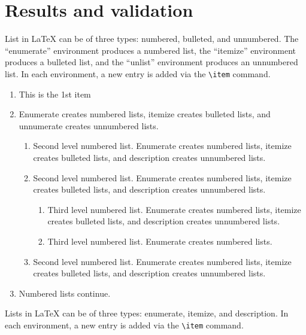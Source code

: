 \documentclass[12pt,a4paper]{article}
\begin{document}
\section{Results and validation}\label{sec7}

List in \LaTeX{} can be of three types: numbered, bulleted, and unnumbered. The ``enumerate'' environment produces a numbered list, the 
``itemize'' environment produces a bulleted list, and the ``unlist''
environment produces an unnumbered list.
In each environment, a new entry is added via the \verb+\item+ command.

\begin{enumerate}[label=\arabic*.]
\item This is the 1st item
\item Enumerate creates numbered lists, itemize creates bulleted lists, and unnumerate creates unnumbered lists.

\begin{enumerate}[label=\alph*.]
\item Second level numbered list. Enumerate creates numbered lists, itemize creates bulleted lists, and description creates unnumbered lists.
\item Second level numbered list. Enumerate creates numbered lists, itemize creates bulleted lists, and description creates unnumbered lists.

\begin{enumerate}[label=(\roman*)]
\item Third level numbered list. Enumerate creates numbered lists, itemize creates bulleted lists, and description creates unnumbered lists.
\item Third level numbered list. Enumerate creates numbered lists.
\end{enumerate}

\item Second level numbered list. Enumerate creates numbered lists, itemize creates bulleted lists, and description creates unnumbered lists.
\end{enumerate}

\item Numbered lists continue.
\end{enumerate}
Lists in \LaTeX{} can be of three types: enumerate, itemize, and description.
In each environment, a new entry is added via the \verb+\item+ command.
\end{document}
